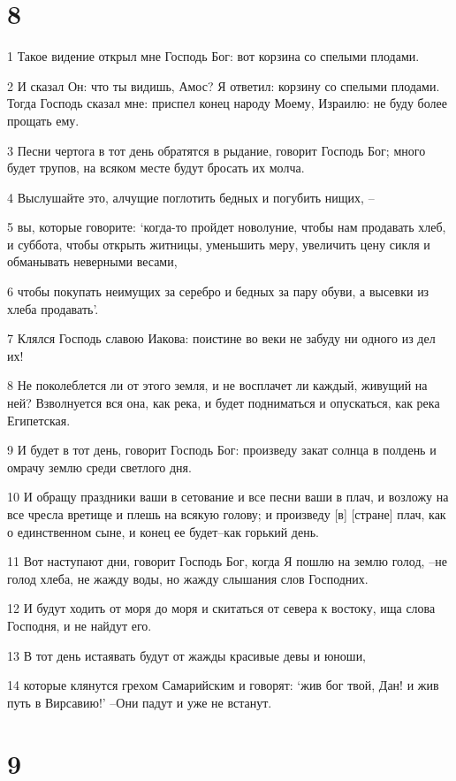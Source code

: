 \chapter{8}

\par 1 Такое видение открыл мне Господь Бог: вот корзина со спелыми плодами.
\par 2 И сказал Он: что ты видишь, Амос? Я ответил: корзину со спелыми плодами. Тогда Господь сказал мне: приспел конец народу Моему, Израилю: не буду более прощать ему.
\par 3 Песни чертога в тот день обратятся в рыдание, говорит Господь Бог; много будет трупов, на всяком месте будут бросать их молча.
\par 4 Выслушайте это, алчущие поглотить бедных и погубить нищих, --
\par 5 вы, которые говорите: `когда-то пройдет новолуние, чтобы нам продавать хлеб, и суббота, чтобы открыть житницы, уменьшить меру, увеличить цену сикля и обманывать неверными весами,
\par 6 чтобы покупать неимущих за серебро и бедных за пару обуви, а высевки из хлеба продавать'.
\par 7 Клялся Господь славою Иакова: поистине во веки не забуду ни одного из дел их!
\par 8 Не поколеблется ли от этого земля, и не восплачет ли каждый, живущий на ней? Взволнуется вся она, как река, и будет подниматься и опускаться, как река Египетская.
\par 9 И будет в тот день, говорит Господь Бог: произведу закат солнца в полдень и омрачу землю среди светлого дня.
\par 10 И обращу праздники ваши в сетование и все песни ваши в плач, и возложу на все чресла вретище и плешь на всякую голову; и произведу [в] [стране] плач, как о единственном сыне, и конец ее будет--как горький день.
\par 11 Вот наступают дни, говорит Господь Бог, когда Я пошлю на землю голод, --не голод хлеба, не жажду воды, но жажду слышания слов Господних.
\par 12 И будут ходить от моря до моря и скитаться от севера к востоку, ища слова Господня, и не найдут его.
\par 13 В тот день истаявать будут от жажды красивые девы и юноши,
\par 14 которые клянутся грехом Самарийским и говорят: `жив бог твой, Дан! и жив путь в Вирсавию!' --Они падут и уже не встанут.

\chapter{9}

